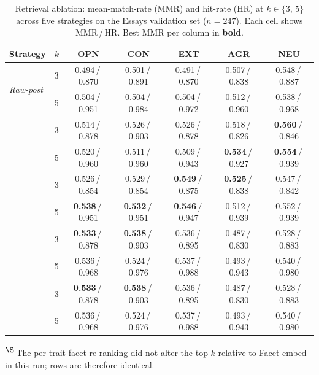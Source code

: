 \documentclass[../main.tex]{subfiles}
\begin{document}
\begin{table}[htbp]
  \centering
  \caption{Retrieval ablation: mean-match-rate (MMR) and hit-rate (HR)
    at $k \in \{3,\,5\}$ across five strategies on the Essays validation set
    ($n=247$). Each cell shows MMR\,/\,HR. Best MMR per column in \textbf{bold}.}
  \label{tab:retrieval-ablation}
  \small
  \begin{tabular}{llccccc}
    \toprule
    \textbf{Strategy} & $k$
      & \textbf{OPN} & \textbf{CON} & \textbf{EXT}
      & \textbf{AGR} & \textbf{NEU} \\
    \midrule
    \multirow{2}{*}{\textit{Raw-post}}
      & 3 & 0.494\,/\,0.870 & 0.501\,/\,0.891 & 0.491\,/\,0.870 & 0.507\,/\,0.838 & 0.548\,/\,0.887 \\
      & 5 & 0.504\,/\,0.951 & 0.504\,/\,0.984 & 0.504\,/\,0.972 & 0.512\,/\,0.960 & 0.538\,/\,0.968 \\
    \addlinespace
    \multirow{2}{*}{\textit{Profile}}
      & 3 & 0.514\,/\,0.878 & 0.526\,/\,0.903 & 0.526\,/\,0.878 & 0.518\,/\,0.826 & \textbf{0.560}\,/\,0.846 \\
      & 5 & 0.520\,/\,0.960 & 0.511\,/\,0.960 & 0.509\,/\,0.943 & \textbf{0.534}\,/\,0.927 & \textbf{0.554}\,/\,0.939 \\
    \addlinespace
    \multirow{2}{*}{\textit{Sliced-dual}}
      & 3 & 0.526\,/\,0.854 & 0.529\,/\,0.854 & \textbf{0.549}\,/\,0.875 & \textbf{0.525}\,/\,0.838 & 0.547\,/\,0.842 \\
      & 5 & \textbf{0.538}\,/\,0.951 & \textbf{0.532}\,/\,0.951 & \textbf{0.546}\,/\,0.947 & 0.512\,/\,0.939 & 0.552\,/\,0.939 \\
    \addlinespace
    \multirow{2}{*}{\textit{Facet-embed}}
      & 3 & \textbf{0.533}\,/\,0.878 & \textbf{0.538}\,/\,0.903 & 0.536\,/\,0.895 & 0.487\,/\,0.830 & 0.528\,/\,0.883 \\
      & 5 & 0.536\,/\,0.968 & 0.524\,/\,0.976 & 0.537\,/\,0.988 & 0.493\,/\,0.943 & 0.540\,/\,0.980 \\
    \addlinespace
    \multirow{2}{*}{\textbf{\textit{Hybrid-facet}}\textsuperscript{$\S$}}
      & 3 & \textbf{0.533}\,/\,0.878 & \textbf{0.538}\,/\,0.903 & 0.536\,/\,0.895 & 0.487\,/\,0.830 & 0.528\,/\,0.883 \\
      & 5 & 0.536\,/\,0.968 & 0.524\,/\,0.976 & 0.537\,/\,0.988 & 0.493\,/\,0.943 & 0.540\,/\,0.980 \\
    \bottomrule
  \end{tabular}

\noindent\textsuperscript{$\S$}\,The per-trait facet re-ranking did not alter the
top-$k$ relative to Facet-embed in this run; rows are therefore identical.
\end{table}
\end{document}
